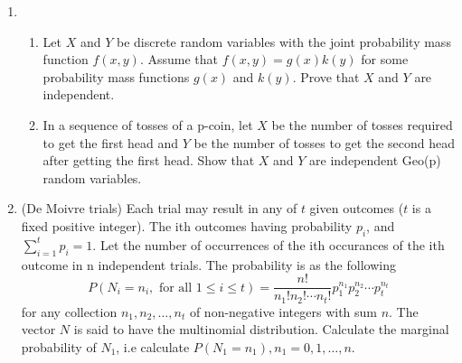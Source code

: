\documentclass[12pt]{article}
\begin{document}
\begin{enumerate}
\item
\begin{enumerate}
\item
Let $X$ and $Y$ be discrete random variables with the joint probability mass function $f(x,y)$. Assume that $f(x,y)=g(x)k(y)$ for some
probability mass functions $g(x)$ and $k(y)$. Prove that $X$ and $Y$ are independent.
\item In a sequence of tosses of a p-coin, let $X$ be the number of tosses required to get the first head and $Y$ be the number of tosses to get the second head after getting the first head. Show that $X$ and $Y$ are independent Geo(p) random variables.
\end{enumerate}

\item
(De Moivre trials) Each trial may result in any of \(t\) given outcomes (\(t\) is a fixed positive integer). The ith outcomes having probability \(p_i\), and \(\sum_{i=1}^{t} p_i  = 1\).
Let the number of occurrences of the ith occurances of the ith outcome in n independent trials. The probability is as the following
\[
    P(N_i = n_i, \text{ for all } 1 \leq i \leq t) = \frac{n!}{n_1!n_2!\cdots n_t!}p_1^{n_1}p_2^{n_2} \cdots p_t^{n_t}
\]
for any collection \(n_1, n_2, \dots, n_t\) of non-negative integers with sum \(n\). The vector \(N\) is said to have the multinomial distribution.
Calculate the marginal probability of \(N_1\), i.e calculate \(P(N_1 = n_1), n_1 = 0,1,\dots,n\).



\end{enumerate}
\end{document}
